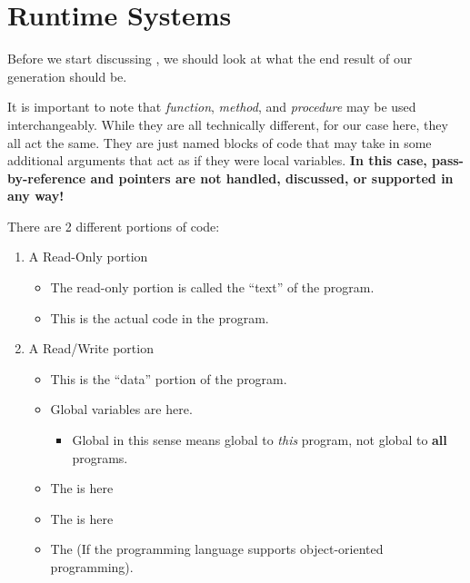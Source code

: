 \section{Runtime Systems}\label{sec:Runtime_Systems}
Before we start discussing , we should look at what the end result of our generation should be.

\begin{remark*}
  It is important to note that \textit{function}, \textit{method}, and \textit{procedure} may be used interchangeably.
  While they are all technically different, for our case here, they all act the same.
  They are just named blocks of code that may take in some additional arguments that act as if they were local variables.
  \textbf{In this case, pass-by-reference and pointers are not handled, discussed, or supported in any way!}
\end{remark*}

There are 2 different portions of code:
\begin{enumerate}[noitemsep]
\item A Read-Only portion
  \begin{itemize}[noitemsep]
  \item The read-only portion is called the ``text'' of the program.
  \item This is the actual code in the program.
  \end{itemize}
\item A Read/Write portion
  \begin{itemize}[noitemsep]
  \item This is the ``data'' portion of the program.
  \item Global variables are here.
    \begin{itemize}[noitemsep]
    \item Global in this sense means global to \emph{this} program, not global to \textbf{all} programs.
    \end{itemize}
  \item The  is here
  \item The  is here
  \item The  (If the programming language supports object-oriented programming).
  \end{itemize}
\end{enumerate}

